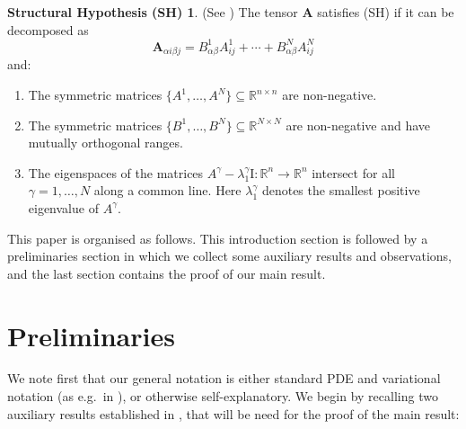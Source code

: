 \documentclass{amsart}
\numberwithin{equation}{section}
\numberwithin{thm}{section}
\theoremstyle{definition}
\newtheorem*{structhyp1}{Structural Hypothesis (SH)}
\renewcommand{\:}{\!:\!} %
\newcommand{\by}{\times}
\renewcommand{\^}[1]{^{#1}_{\phantom{l}}}
\begin{document}
\begin{structhyp1}(See \cite{nikos1})
The tensor $\mathbf{A}$ satisfies (SH) if it can be decomposed as 
\[
\mathbf{A}_{\alpha i \beta j} = B^1_{\alpha \beta}A^1_{ij} + \cdots + B^N_{\alpha \beta}A^N_{ij}
\]
and:
\begin{enumerate}[label=(\alph*)]
\item The symmetric matrices $\{A^1, \dotsc, A^N\} \subseteq \mathbb{R}^{n \by n}$ are non-negative.
\item The symmetric matrices $\{B^1, \dotsc, B^N\} \subseteq \mathbb{R}^{N \by N}$ are non-negative and have mutually orthogonal ranges. 
\item The eigenspaces of the matrices $A^{\gamma} - \lambda^{\gamma}_1 \mathrm I : \mathbb{R}^n \longrightarrow \mathbb{R}^n$ intersect for all $\gamma = 1, \dotsc, N$ along a common line. Here $\lambda^{\gamma}_1$ denotes the smallest positive eigenvalue of $A^\gamma$.
\end{enumerate}
\end{structhyp1}
This paper is organised as follows. This introduction section is followed by a preliminaries section in which we collect some auxiliary results and observations, and the last section contains the proof of our main result.












\section{Preliminaries}


We note first that our general notation is either standard PDE and variational notation (as e.g.\ in  \cite{E,EG,D,GM}), or otherwise self-explanatory. We begin by recalling two auxiliary results established in \cite{nikos1}, that will be need for the proof of the main result:
\end{document}
